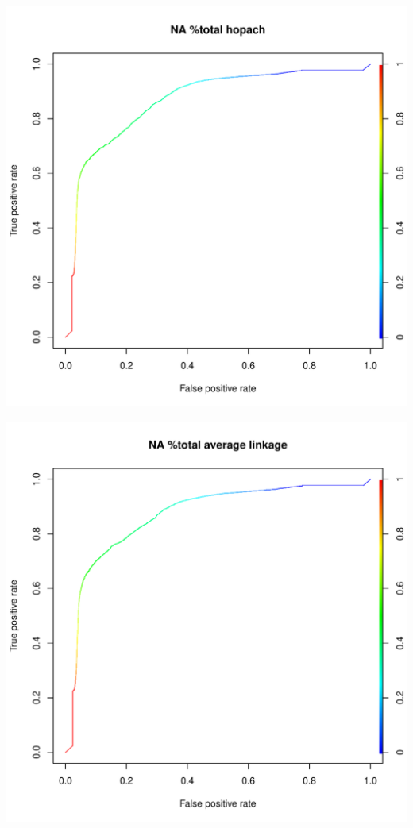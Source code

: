 \documentclass[11pt,a4paper,twoside]{report}\usepackage[]{graphicx}\usepackage[]{color}
\makeatletter
\def\maxwidth{ %
  \ifdim\Gin@nat@width>\linewidth
    \linewidth
  \else
    \Gin@nat@width
  \fi
}
\newenvironment{knitrout}{}{} %
\makeatother
\begin{document}
\begin{knitrout}
\includegraphics[width=\maxwidth]{figure/fig_code-25} 

\includegraphics[width=\maxwidth]{figure/fig_code-26} 


\end{knitrout}
\end{document}
